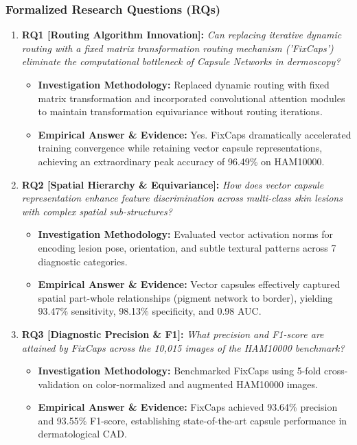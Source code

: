 \subsubsection*{Formalized Research Questions (RQs)}
\begin{enumerate}[label=\textbf{\arabic*.}, leftmargin=*]
  \item \textbf{RQ1 [Routing Algorithm Innovation]:} \textit{Can replacing iterative dynamic routing with a fixed matrix transformation routing mechanism ('FixCaps') eliminate the computational bottleneck of Capsule Networks in dermoscopy?}
  \begin{itemize}[leftmargin=1.5em]
    \item \textbf{Investigation Methodology:} Replaced dynamic routing with fixed matrix transformation and incorporated convolutional attention modules to maintain transformation equivariance without routing iterations.
    \item \textbf{Empirical Answer \& Evidence:} Yes. FixCaps dramatically accelerated training convergence while retaining vector capsule representations, achieving an extraordinary peak accuracy of 96.49\% on HAM10000.
  \end{itemize}
  \item \textbf{RQ2 [Spatial Hierarchy \& Equivariance]:} \textit{How does vector capsule representation enhance feature discrimination across multi-class skin lesions with complex spatial sub-structures?}
  \begin{itemize}[leftmargin=1.5em]
    \item \textbf{Investigation Methodology:} Evaluated vector activation norms for encoding lesion pose, orientation, and subtle textural patterns across 7 diagnostic categories.
    \item \textbf{Empirical Answer \& Evidence:} Vector capsules effectively captured spatial part-whole relationships (pigment network to border), yielding 93.47\% sensitivity, 98.13\% specificity, and 0.98 AUC.
  \end{itemize}
  \item \textbf{RQ3 [Diagnostic Precision \& F1]:} \textit{What precision and F1-score are attained by FixCaps across the 10,015 images of the HAM10000 benchmark?}
  \begin{itemize}[leftmargin=1.5em]
    \item \textbf{Investigation Methodology:} Benchmarked FixCaps using 5-fold cross-validation on color-normalized and augmented HAM10000 images.
    \item \textbf{Empirical Answer \& Evidence:} FixCaps achieved 93.64\% precision and 93.55\% F1-score, establishing state-of-the-art capsule performance in dermatological CAD.

\end{itemize}
\end{enumerate}
